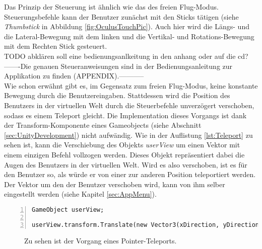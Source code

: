 Das Prinzip der Steuerung ist ähnlich wie das des freien Flug-Modus. Steuerungsbefehle kann der Benutzer zunächst mit den Sticks tätigen (siehe \textit{Thumbstick} in Abbildung \ref{fig:OculusTouchPic}). Auch hier wird die Längs- und die Lateral-Bewegung mit dem linken und die Vertikal- und Rotations-Bewegung mit dem Rechten Stick gesteuert.\\ 

TODO abklären soll eine bedienungsanlkeitung in den anhang oder auf die cd?
-------Die genauen Steueranweisungen sind in der Bedienungsanleitung zur Applikation zu finden (APPENDIX).-----------\\

Wie schon erwähnt gibt es, im Gegensatz zum freien Flug-Modus, keine konstante Bewegung durch die Benutzereingaben. Stattdessen wird die Position des Benutzers in der virtuellen Welt durch die Steuerbefehle unverzögert verschoben, sodass es einem Teleport gleicht. Die Implementation dieses Vorgangs ist dank der Transform-Komponente eines Gameobjects (siehe Abschnitt \ref{sec:UnityDevelopment}) nicht aufwändig. Wie in der Auflistung \ref{lst:Teleport} zu sehen ist, kann die Verschiebung des Objekts \textit{userView} um einen Vektor mit einem einzigen Befehl vollzogen werden. Dieses Objekt repräsentiert dabei die Augen des Benutzers in der virtuellen Welt. Wird es also verschoben, ist es für den Benutzer so, als würde er von einer zur anderen Position teleportiert werden. Der Vektor um den der Benutzer verschoben wird, kann von ihm selber eingestellt werden (siehe Kapitel \ref{sec:AppMenu}).

\begin{lstlisting}[caption={Implementierung des Teleportationsbefehls}, captionpos=t, numbers=left, label=lst:Teleport]
GameObject userView;

userView.transform.Translate(new Vector3(xDirection, yDirection, zDirection));
\end{lstlisting}
\quad

\begin{figure}%
    \centering
    \qquad
    \caption{Zu sehen ist der Vorgang eines Pointer-Teleports.}
    \label{fig:Components}%
\end{figure}

